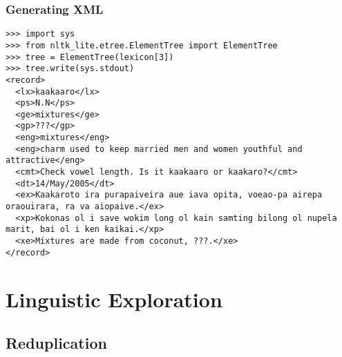 \documentclass{beamer}             %
\begin{document}
\begin{frame}[fragile]
\frametitle{Generating XML}

\scriptsize
\begin{verbatim}
>>> import sys
>>> from nltk_lite.etree.ElementTree import ElementTree
>>> tree = ElementTree(lexicon[3])
>>> tree.write(sys.stdout)
<record>
  <lx>kaakaaro</lx>
  <ps>N.N</ps>
  <ge>mixtures</ge>
  <gp>???</gp>
  <eng>mixtures</eng>
  <eng>charm used to keep married men and women youthful and attractive</eng>
  <cmt>Check vowel length. Is it kaakaaro or kaakaro?</cmt>
  <dt>14/May/2005</dt>
  <ex>Kaakaroto ira purapaiveira aue iava opita, voeao-pa airepa oraouirara, ra va aiopaive.</ex>
  <xp>Kokonas ol i save wokim long ol kain samting bilong ol nupela marit, bai ol i ken kaikai.</xp>
  <xe>Mixtures are made from coconut, ???.</xe>
</record>
\end{verbatim}
\end{frame}

\section{Linguistic Exploration}

\subsection{Reduplication}
\end{document}
